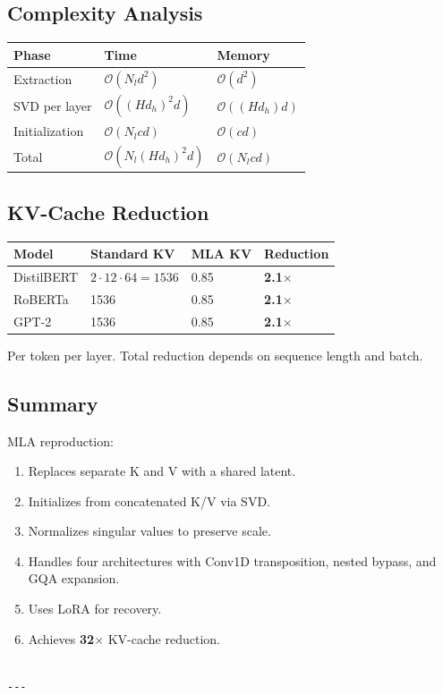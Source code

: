 \subsection{Complexity Analysis}

\begin{table}[H]
\centering
\small
\begin{tabular}{lll}
\toprule
\textbf{Phase} & \textbf{Time} & \textbf{Memory} \\
\midrule
Extraction & $\mathcal{O}(N_l d^2)$ & $\mathcal{O}(d^2)$ \\
SVD per layer & $\mathcal{O}((H d_h)^2 d)$ & $\mathcal{O}((H d_h) d)$ \\
Initialization & $\mathcal{O}(N_l c d)$ & $\mathcal{O}(c d)$ \\
Total & $\mathcal{O}(N_l (H d_h)^2 d)$ & $\mathcal{O}(N_l c d)$ \\
\bottomrule
\end{tabular}
\end{table}

\subsection{KV-Cache Reduction}

\begin{table}[H]
\centering
\small
\begin{tabular}{llll}
\toprule
\textbf{Model} & \textbf{Standard KV} & \textbf{MLA KV} & \textbf{Reduction} \\
\midrule
DistilBERT & $2 \cdot 12 \cdot 64 = 1536$ & 0.85 & \textbf{2.1$\times$} \\
RoBERTa & 1536 & 0.85 & \textbf{2.1$\times$} \\
GPT-2 & 1536 & 0.85 & \textbf{2.1$\times$} \\
\bottomrule
\end{tabular}
\end{table}

Per token per layer. Total reduction depends on sequence length and batch.

\subsection{Summary}

MLA reproduction:
\begin{enumerate}
\item Replaces separate K and V with a shared latent.
\item Initializes from concatenated K/V via SVD.
\item Normalizes singular values to preserve scale.
\item Handles four architectures with Conv1D transposition, nested bypass, and
  GQA expansion.
\item Uses LoRA for recovery.
\item Achieves \textbf{32$\times$} KV-cache reduction.
\end{enumerate}
\begin{lstlisting}

---
\end{lstlisting}


